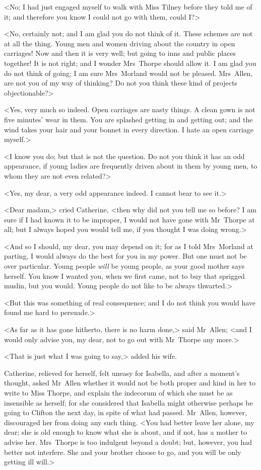  <No; I had just engaged myself to walk with Miss Tilney before they told me of it; and therefore you know I could not go with them, could I?> 

 <No, certainly not; and I am glad you do not think of it. These schemes are not at all the thing. Young men and women driving about the country in open carriages! Now and then it is very well; but going to inns and public places together! It is not right; and I wonder Mrs~Thorpe should allow it. I am glad you do not think of going; I am sure Mrs~Morland would not be pleased. Mrs~Allen, are not you of my way of thinking? Do not you think these kind of projects objectionable?> 

 <Yes, very much so indeed. Open carriages are nasty things. A clean gown is not five minutes' wear in them. You are splashed getting in and getting out; and the wind takes your hair and your bonnet in every direction. I hate an open carriage myself.> 

 <I know you do; but that is not the question. Do not you think it has an odd appearance, if young ladies are frequently driven about in them by young men, to whom they are not even related?> 

 <Yes, my dear, a very odd appearance indeed. I cannot bear to see it.> 

 <Dear madam,> cried Catherine, <then why did not you tell me so before? I am sure if I had known it to be improper, I would not have gone with Mr~Thorpe at all; but I always hoped you would tell me, if you thought I was doing wrong.> 

 <And so I should, my dear, you may depend on it; for as I told Mrs~Morland at parting, I would always do the best for you in my power. But one must not be over particular. Young people \textit{will} be young people, as your good mother says herself. You know I wanted you, when we first came, not to buy that sprigged muslin, but you would. Young people do not like to be always thwarted.> 

 <But this was something of real consequence; and I do not think you would have found me hard to persuade.> 

 <As far as it has gone hitherto, there is no harm done,> said Mr~Allen; <and I would only advise you, my dear, not to go out with Mr~Thorpe any more.> 

 <That is just what I was going to say,> added his wife. 

 Catherine, relieved for herself, felt uneasy for Isabella, and after a moment's thought, asked Mr~Allen whether it would not be both proper and kind in her to write to Miss Thorpe, and explain the indecorum of which she must be as insensible as herself; for she considered that Isabella might otherwise perhaps be going to Clifton the next day, in spite of what had passed. Mr~Allen, however, discouraged her from doing any such thing. <You had better leave her alone, my dear; she is old enough to know what she is about, and if not, has a mother to advise her. Mrs~Thorpe is too indulgent beyond a doubt; but, however, you had better not interfere. She and your brother choose to go, and you will be only getting ill will.> 

